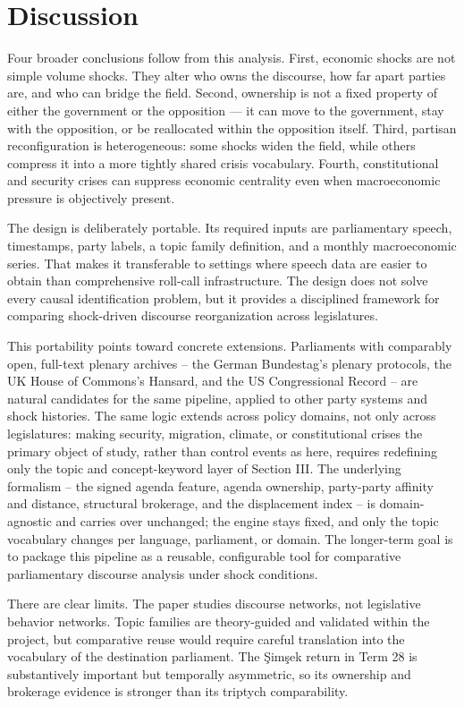 \documentclass[conference]{IEEEtran}
\begin{document}
\FloatBarrier

\smallskip
\section{Discussion}
Four broader conclusions follow from this analysis. First, economic shocks are not simple volume shocks. They alter who owns the discourse, how far apart parties are, and who can bridge the field. Second, ownership is not a fixed property of either the government or the opposition — it can move to the government, stay with the opposition, or be reallocated within the opposition itself. Third, partisan reconfiguration is heterogeneous: some shocks widen the field, while others compress it into a more tightly shared crisis vocabulary. Fourth, constitutional and security crises can suppress economic centrality even when macroeconomic pressure is objectively present.

The design is deliberately portable. Its required inputs are parliamentary speech, timestamps, party labels, a topic family definition, and a monthly macroeconomic series. That makes it transferable to settings where speech data are easier to obtain than comprehensive roll-call infrastructure. The design does not solve every causal identification problem, but it provides a disciplined framework for comparing shock-driven discourse reorganization across legislatures.

This portability points toward concrete extensions. Parliaments with comparably open, full-text plenary archives -- the German Bundestag's plenary protocols, the UK House of Commons's Hansard, and the US Congressional Record -- are natural candidates for the same pipeline, applied to other party systems and shock histories. The same logic extends across policy domains, not only across legislatures: making security, migration, climate, or constitutional crises the primary object of study, rather than control events as here, requires redefining only the topic and concept-keyword layer of Section III. The underlying formalism -- the signed agenda feature, agenda ownership, party-party affinity and distance, structural brokerage, and the displacement index -- is domain-agnostic and carries over unchanged; the engine stays fixed, and only the topic vocabulary changes per language, parliament, or domain. The longer-term goal is to package this pipeline as a reusable, configurable tool for comparative parliamentary discourse analysis under shock conditions.

There are clear limits. The paper studies discourse networks, not legislative behavior networks. Topic families are theory-guided and validated within the project, but comparative reuse would require careful translation into the vocabulary of the destination parliament. The Şimşek return in Term 28 is substantively important but temporally asymmetric, so its ownership and brokerage evidence is stronger than its triptych comparability.
\end{document}
